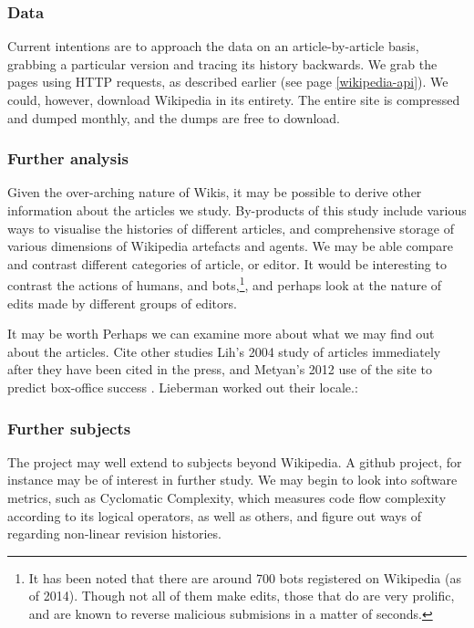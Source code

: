 \documentclass[a4paper,11pt,twoside,notitlepage]{article}
\begin{document}
        \subsubsection*{Data}
        Current intentions are to approach the data on an
        article-by-article basis, grabbing a particular version and
        tracing its history backwards. We grab the pages using HTTP
        requests, as described earlier (see page
        \ref{wikipedia-api}). We could, however, download Wikipedia in
        its entirety. The entire site is compressed and dumped
        monthly, and the dumps are free to download.\cite{wiki-dump}

        \subsubsection*{Further analysis}
        Given the over-arching nature of Wikis, it may be possible to
        derive other information about the articles we
        study. By-products of this study include various ways to
        visualise the histories of different articles, and
        comprehensive storage of various dimensions of Wikipedia
        artefacts and agents. We may be able compare and contrast
        different categories of article, or editor. It would be
        interesting to contrast the actions of humans, and
        bots,\footnote{It has been noted that there are around 700
          bots registered on Wikipedia (as of 2014). Though not all of
          them make edits, those that do are very prolific, and are
          known to reverse malicious submisions in a matter of
          seconds.\cite{wiki-bots}\cite{bbc-bots}}, and perhaps look
        at the nature of edits made by different groups of editors.

        
        It may be worth Perhaps we can examine more about what
        we may find out about the articles. Cite other studies Lih's
        2004 study of articles immediately after they have been cited
        in the press\cite{Lih2004}, and Metyan's 2012 use of the site
        to predict box-office success \cite{Mestyan2012}. Lieberman
        worked out their locale.\cite{Lieberman2009}:


        \subsubsection*{Further subjects}
        The project may well extend to subjects beyond Wikipedia. A
        github project, for instance may be of interest in further
        study. We may begin to look into software metrics, such as
        Cyclomatic Complexity, which measures code flow complexity
        according to its logical operators,\cite{McCabe1976} as well
        as others, and figure out ways of regarding non-linear
        revision histories.
\end{document}
